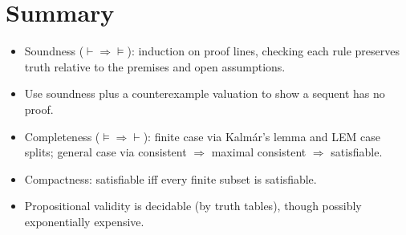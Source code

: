 \section*{Summary}
\begin{itemize}
  \item Soundness ($\vdash\Rightarrow\models$): induction on proof lines, checking each
        rule preserves truth relative to the premises and open assumptions.
  \item Use soundness plus a counterexample valuation to show a sequent has no proof.
  \item Completeness ($\models\Rightarrow\vdash$): finite case via Kalm\'ar's lemma and
        LEM case splits; general case via consistent $\Rightarrow$ maximal consistent
        $\Rightarrow$ satisfiable.
  \item Compactness: satisfiable iff every finite subset is satisfiable.
  \item Propositional validity is decidable (by truth tables), though possibly
        exponentially expensive.
\end{itemize}
